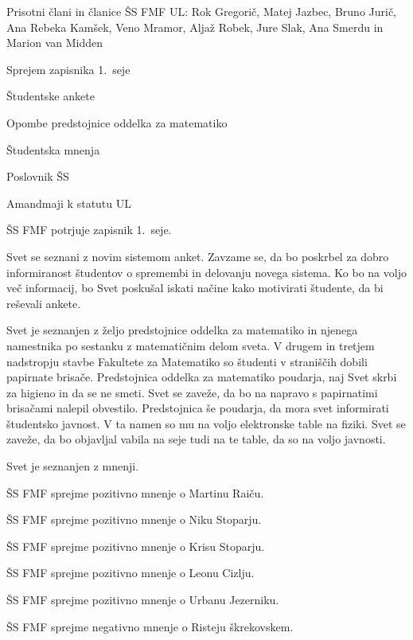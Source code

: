 \documentclass{seja}
\begin{document}
Prisotni člani in članice ŠS FMF UL:  Rok Gregorič, Matej Jazbec, Bruno Jurič,
Ana Rebeka Kamšek, Veno Mramor, Aljaž Robek, Jure Slak, Ana Smerdu in Marion van
Midden

\begin{red*}
\item Sprejem zapisnika 1.~seje
\item Študentske ankete
\item Opombe predstojnice oddelka za matematiko
\item Študentska mnenja
\item Poslovnik ŠS
\item Amandmaji k statutu UL
\end{red*}

\begin{ad}
\item
\begin{sklep*}
  ŠS FMF potrjuje zapisnik 1.~seje.
\end{sklep*}

\item
Svet se seznani z novim sistemom anket. Zavzame se, da bo poskrbel za dobro informiranost
študentov o spremembi in delovanju novega sistema. Ko bo na voljo več informacij, bo Svet poskušal iskati načine kako motivirati študente, da bi reševali ankete.

\item
Svet je seznanjen z željo predstojnice oddelka za matematiko in njenega namestnika po
sestanku z matematičnim delom sveta. V drugem in tretjem nadstropju stavbe Fakultete za
Matematiko so študenti v straniščih dobili papirnate brisače. Predstojnica oddelka za
matematiko poudarja, naj Svet skrbi za higieno in da se ne smeti. Svet se zaveže, da bo
na napravo s papirnatimi brisačami nalepil obvestilo. Predstojnica še poudarja, da mora
svet informirati študentsko javnost. V ta namen so mu na voljo elektronske table na
fiziki. Svet se zaveže, da bo objavljal vabila na seje tudi na te table, da so na
voljo javnosti.

\item
Svet je seznanjen z mnenji.

\begin{sklep*} ŠS FMF sprejme pozitivno mnenje o Martinu Raiču.        \end{sklep*}
\begin{sklep*} ŠS FMF sprejme pozitivno mnenje o Niku Stoparju.        \end{sklep*}
\begin{sklep*} ŠS FMF sprejme pozitivno mnenje o Krisu Stoparju.       \end{sklep*}
\begin{sklep*} ŠS FMF sprejme pozitivno mnenje o Leonu Cizlju.         \end{sklep*}
\begin{sklep*} ŠS FMF sprejme pozitivno mnenje o Urbanu Jezerniku.     \end{sklep*}
\begin{sklep*} ŠS FMF sprejme negativno mnenje o Risteju škrekovskem.  \end{sklep*}


\end{ad}
\end{document}
